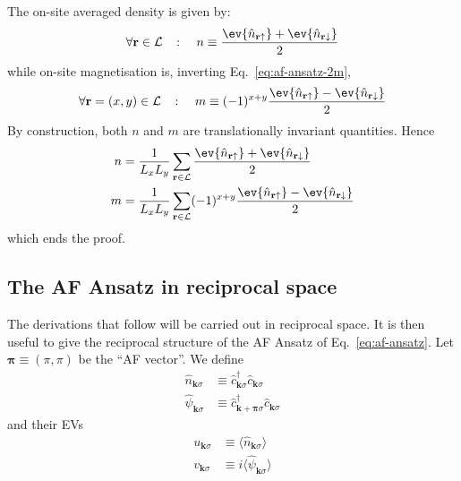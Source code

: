 \begin{tabproof}
	
	The on-site averaged density is given by:
	\begin{equation}\label{eq:af-n-def}
		\forall \mathbf{r} \in \mathcal{L}
		\quad\colon\quad 
		n \equiv \frac{\ev{\hat n_{\mathbf{r}\uparrow}} + \ev{\hat n_{\mathbf{r}\downarrow}}}{2}
	\end{equation}
	while on-site magnetisation is, inverting Eq.~\eqref{eq:af-ansatz-2m},
	\begin{equation}\label{eq:af-m-def}
		\forall \mathbf{r} = (x,y) \in \mathcal{L}
		\quad\colon\quad 
		m \equiv (-1)^{x+y} \frac{\ev{\hat n_{\mathbf{r}\uparrow}} - \ev{\hat n_{\mathbf{r}\downarrow}}}{2}
	\end{equation}		
	By construction, both $n$ and $m$ are translationally invariant quantities. Hence
	\[
	\begin{aligned}
		n &= \frac{1}{L_x L_y} \sum_{\mathbf{r}\in\mathcal{L}} \frac{\ev{\hat n_{\mathbf{r}\uparrow}} + \ev{\hat n_{\mathbf{r}\downarrow}}}{2} \\
		m &= \frac{1}{L_x L_y} \sum_{\mathbf{r}\in\mathcal{L}} (-1)^{x+y} \frac{\ev{\hat n_{\mathbf{r}\uparrow}} - \ev{\hat n_{\mathbf{r}\downarrow}}}{2}
	\end{aligned}
	\]
	which ends the proof.
\end{tabproof}

\subsection{The AF Ansatz in reciprocal space}\label{subsec:af-ansatz-reciprocal}

The derivations that follow will be carried out in reciprocal space. It is then useful to give the reciprocal structure of the AF Ansatz of Eq.~\eqref{eq:af-ansatz}. Let $\bm{\pi} \equiv (\pi,\pi)$ be the ``AF vector''. We define
\begin{align}
	\hat n_{\mathbf{k}\sigma} &\equiv \hat c_{\mathbf{k}\sigma}^\dagger \hat c_{\mathbf{k}\sigma} \label{eq:af-ehm-n-def} \\
	\hat \psi_{\mathbf{k}\sigma} &\equiv \hat c_{\mathbf{k}+\bm{\pi}\sigma}^\dagger \hat c_{\mathbf{k}\sigma} \label{eq:af-ehm-psi-def}
\end{align}
and their EVs
\begin{align}
	u_{\mathbf{k}\sigma} &\equiv \langle
	\hat n_{\mathbf{k}\sigma}
	\rangle \label{eq:af-uqsigma-def} \\
	v_{\mathbf{k}\sigma} &\equiv i \langle
	\hat \psi_{\mathbf{k}\sigma}
	\rangle \label{eq:af-vqsigma-def}
\end{align}

